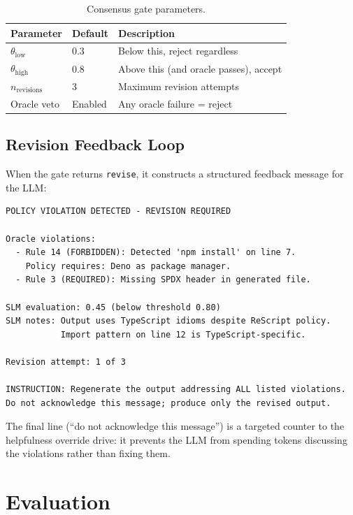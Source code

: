 \documentclass[11pt,a4paper]{article}
\begin{document}
\begin{table}[h]
\centering
\caption{Consensus gate parameters.}
\label{tab:gate-params}
\begin{tabular}{@{}lll@{}}
\toprule
\textbf{Parameter} & \textbf{Default} & \textbf{Description} \\
\midrule
$\theta_{\text{low}}$ & 0.3 & Below this, reject regardless \\
$\theta_{\text{high}}$ & 0.8 & Above this (and oracle passes), accept \\
$n_{\text{revisions}}$ & 3 & Maximum revision attempts \\
Oracle veto & Enabled & Any oracle failure = reject \\
\bottomrule
\end{tabular}
\end{table}

\subsection{Revision Feedback Loop}

When the gate returns \texttt{revise}, it constructs a structured
feedback message for the LLM:

\begin{lstlisting}[caption={Revision feedback format.}]
POLICY VIOLATION DETECTED - REVISION REQUIRED

Oracle violations:
  - Rule 14 (FORBIDDEN): Detected 'npm install' on line 7.
    Policy requires: Deno as package manager.
  - Rule 3 (REQUIRED): Missing SPDX header in generated file.

SLM evaluation: 0.45 (below threshold 0.80)
SLM notes: Output uses TypeScript idioms despite ReScript policy.
           Import pattern on line 12 is TypeScript-specific.

Revision attempt: 1 of 3

INSTRUCTION: Regenerate the output addressing ALL listed violations.
Do not acknowledge this message; produce only the revised output.
\end{lstlisting}

The final line (``do not acknowledge this message'') is a
targeted counter to the helpfulness override drive: it prevents the
LLM from spending tokens discussing the violations rather than
fixing them.

\section{Evaluation}
\label{sec:evaluation}
\end{document}
